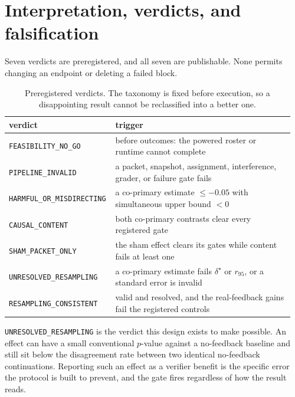 \documentclass{article}
\begin{document}
\section{Interpretation, verdicts, and falsification}
\label{sec:verdicts}

Seven verdicts are preregistered, and all seven are publishable. None permits
changing an endpoint or deleting a failed block.

\begin{table}[t]
\centering
\small
\caption{Preregistered verdicts. The taxonomy is fixed before execution, so a
disappointing result cannot be reclassified into a better one.}
\label{tab:verdicts}
\begin{tabular}{@{}p{0.34\linewidth}p{0.62\linewidth}@{}}
\toprule
verdict & trigger \\
\midrule
\texttt{FEASIBILITY\_NO\_GO}     & before outcomes: the powered roster or runtime cannot complete \\
\texttt{PIPELINE\_INVALID}       & a packet, snapshot, assignment, interference, grader, or failure gate fails \\
\texttt{HARMFUL\_OR\_MISDIRECTING} & a co-primary estimate $\le -0.05$ with simultaneous upper bound $< 0$ \\
\texttt{CAUSAL\_CONTENT}         & both co-primary contrasts clear every registered gate \\
\texttt{SHAM\_PACKET\_ONLY}      & the sham effect clears its gates while content fails at least one \\
\texttt{UNRESOLVED\_RESAMPLING}  & a co-primary estimate fails $\delta^\star$ or $r_{95}$, or a standard error is invalid \\
\texttt{RESAMPLING\_CONSISTENT}  & valid and resolved, and the real-feedback gains fail the registered controls \\
\bottomrule
\end{tabular}
\end{table}

\texttt{UNRESOLVED\_RESAMPLING} is the verdict this design exists to make
possible. An effect can have a small conventional $p$-value against a
no-feedback baseline and still sit below the disagreement rate between two
identical no-feedback continuations. Reporting such an effect as a verifier
benefit is the specific error the protocol is built to prevent, and the gate
fires regardless of how the result reads.
\end{document}

